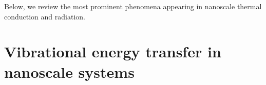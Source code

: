 

Below, we review the most prominent phenomena appearing in nanoscale thermal conduction and radiation. %




\section{Vibrational energy transfer in nanoscale systems}

